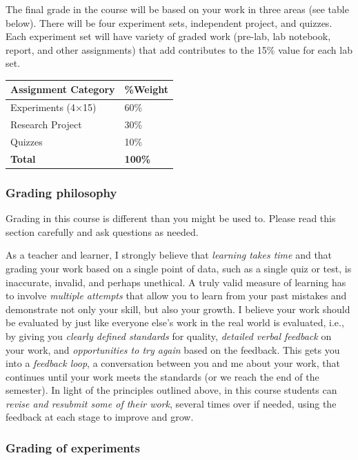 The final grade in the course will be based on your work in three areas
(see table below). There will be four experiment sets, independent
project, and quizzes. Each experiment set will have variety of graded
work (pre-lab, lab notebook, report, and other assignments) that add
contributes to the 15\% value for each lab set.

\begin{longtable}[]{@{}ll@{}}
\toprule\noalign{}
Assignment Category & \%Weight \\
\midrule\noalign{}
\endhead
\bottomrule\noalign{}
\endlastfoot
Experiments (4×15) & 60\% \\
Research Project & 30\% \\
Quizzes & 10\% \\
\textbf{Total} & \textbf{100\%} \\
\end{longtable}

\subsubsection{Grading philosophy}\label{grading-philosophy}

Grading in this course is different than you might be used to. Please
read this section carefully and ask questions as needed.

As a teacher and learner, I strongly believe that \emph{learning takes
time} and that grading your work based on a single point of data, such
as a single quiz or test, is inaccurate, invalid, and perhaps unethical.
A truly valid measure of learning has to involve \emph{multiple
attempts} that allow you to learn from your past mistakes and
demonstrate not only your skill, but also your growth. I believe your
work should be evaluated by just like everyone else's work in the real
world is evaluated, i.e., by giving you \emph{clearly defined standards}
for quality, \emph{detailed verbal feedback} on your work, and
\emph{opportunities to try again} based on the feedback. This gets you
into a \emph{feedback loop}, a conversation between you and me about
your work, that continues until your work meets the standards (or we
reach the end of the semester). In light of the principles outlined
above, in this course students can \emph{revise and resubmit some of
their work}, several times over if needed, using the feedback at each
stage to improve and grow.

\subsubsection{Grading of experiments}\label{grading-of-experiments}

